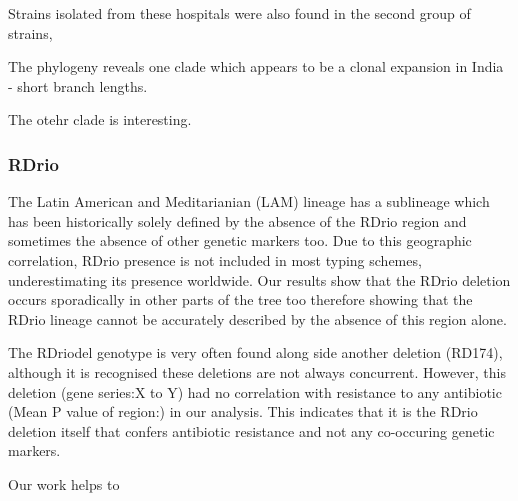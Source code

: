 Strains isolated from these hospitals were also found in the second group of strains,

The phylogeny reveals one clade which appears to be a clonal expansion in India - short branch lengths.

The otehr clade is interesting. 


\subsubsection{RDrio}


The Latin American and Meditarianian (LAM) lineage has a sublineage which has been historically solely defined by the absence of the RDrio region and sometimes the absence of other genetic markers too. Due to this geographic correlation, RDrio presence is not included in most typing schemes, underestimating its presence worldwide. Our results show that the RDrio deletion occurs sporadically in other parts of the tree too therefore showing that the RDrio lineage cannot be accurately described by the absence of this region alone.


The RDriodel genotype is very often found along side another deletion (RD174), although it is recognised these deletions are not always concurrent. However, this deletion (gene series:X to Y) had no correlation with resistance to any antibiotic (Mean P value of region:) in our analysis. This indicates that it is the RDrio deletion itself that confers antibiotic resistance and not any co-occuring genetic markers.




Our work helps to

\clearpage
%

 

 
 